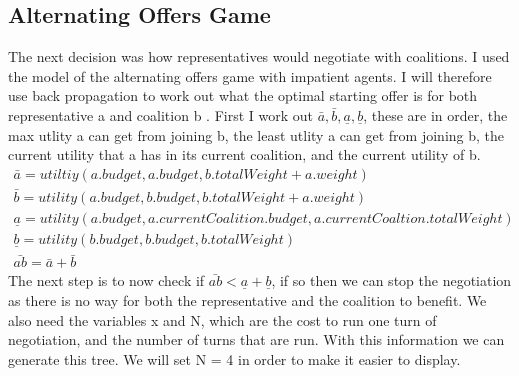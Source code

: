 \subsection{Alternating Offers Game}
The next decision was how representatives would negotiate with coalitions. I used the model of the alternating offers game with impatient agents. I will therefore use back propagation to work out what the optimal starting offer is for both representative a and coalition b . First I work out  $ \bar{a}, \bar{b}, \underline{a}, \underline{b} $, these are in order, the max utlity a can get from joining b, the least utlity a can get from joining b, the current utility that a has in its current coalition, and the current utility of b.
\begin{gather*}
\bar{a} = utiltiy(a.budget,a.budget,b.totalWeight +  a.weight) \\
\bar{b} = utility(a.budget,b.budget,b.totalWeight +  a.weight) \\
\underline{a} = utility(a.budget,a.currentCoalition.budget,a.currentCoaltion.totalWeight) \\
\underline{b} = utility(b.budget,b.budget,b.totalWeight) \\ 
\bar{ab} = \bar{a} + \bar{b} 
\end{gather*}
The next step is to now check if  $\bar{ab} < \underline{a} + \underline{b}$, if so then we can stop the negotiation as there is no way for both the representative and the coalition to benefit. We also need the variables x and N, which are the cost to run one turn of negotiation, and the number of turns that are run. With this information we can generate this tree. We will set N = 4 in order to make it easier to display.
\\

